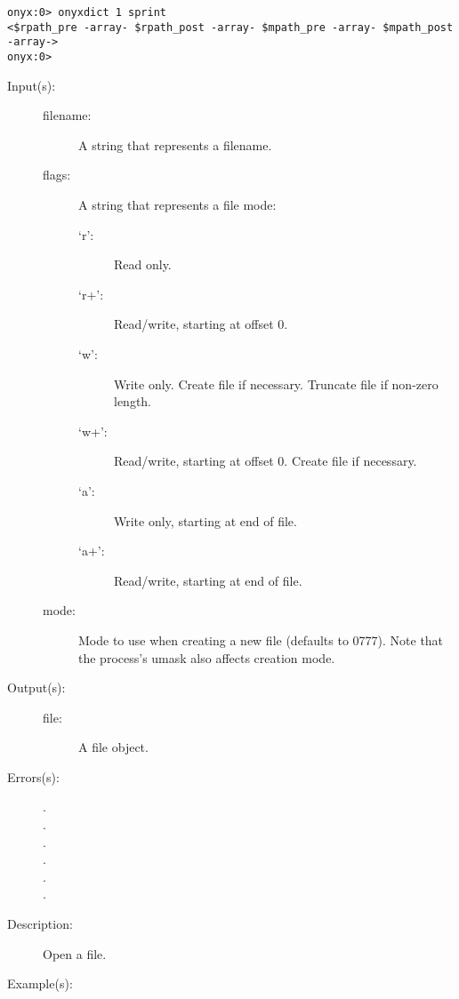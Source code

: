 \begin{description}
\begin{description}
\begin{verbatim}
onyx:0> onyxdict 1 sprint
<$rpath_pre -array- $rpath_post -array- $mpath_pre -array- $mpath_post -array->
onyx:0>
		\end{verbatim}
	\end{description}
\label{systemdict:open}
\item[{\onyxop{filename flags}{open}{file}}: ]
\item[{\onyxop{filename flags mode}{open}{file}}: ]
	\begin{description}\item[]
	\item[Input(s): ]
		\begin{description}\item[]
		\item[filename: ]
			A string that represents a filename.
		\item[flags: ]
			A string that represents a file mode:
			\begin{description}%
			\item[`r': ]
				Read only.
			\item[`r+': ]
				Read/write, starting at offset 0.
			\item[`w': ]
				Write only.  Create file if necessary.  Truncate
				file if non-zero length.
			\item[`w+': ]
				Read/write, starting at offset 0.  Create
				file if necessary.
			\item[`a': ]
				Write only, starting at end of file.
			\item[`a+': ]
				Read/write, starting at end of file.
			\end{description}
		\item[mode: ]
			Mode to use when creating a new file (defaults to 0777).
			Note that the process's umask also affects creation
			mode.
		\end{description}
	\item[Output(s): ]
		\begin{description}\item[]
		\item[file: ]
			A file object.
		\end{description}
	\item[Errors(s): ]
		\begin{description}\item[]
		\item[.]
		\item[.]
		\item[.]
		\item[.]
		\item[.]
		\item[.]
		\end{description}
	\item[Description: ]
		Open a file.
	\item[Example(s): ]\begin{verbatim}


\end{verbatim}
\end{description}
\end{description}
